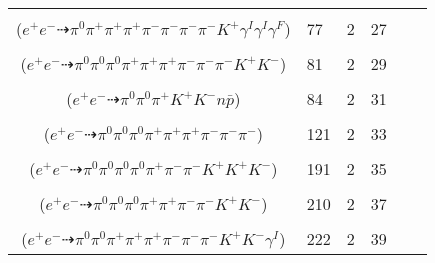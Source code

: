 \documentclass[landscape]{article}
\newcounter{rownumbers}
\newcommand\rn{\stepcounter{rownumbers}\arabic{rownumbers}}
\newcommand{\EOL}{\\} %
\newcommand{\topoTags}[1]{#1} %
\begin{document}
\begin{longtable}{clcccc}
\rn & \makecell[l]{ $ 
e^{+} e^{-} \rightarrow \pi^{0} \rho^{0} \pi^{+} \pi^{-} \pi^{-} \bar{K}^{0} K^{+} \gamma^{I} \gamma^{I} ,
\rho^{0} \rightarrow \pi^{+} \pi^{-} \gamma^{F} ,
\bar{K}^{0} \rightarrow K_{S}^{0} ,
K_{S}^{0} \rightarrow \pi^{+} \pi^{-} 
$ \\ ($
e^{+} e^{-} \dashrightarrow \pi^{0} \pi^{+} \pi^{+} \pi^{+} \pi^{-} \pi^{-} \pi^{-} \pi^{-} K^{+} \gamma^{I} \gamma^{I} \gamma^{F} 
$) } & \topoTags{77 & }2 & 27 \EOL

\rn & \makecell[l]{ $ 
e^{+} e^{-} \rightarrow \pi^{0} \pi^{+} \pi^{+} \pi^{-} \rho^{+} \rho^{-} K^{*} K^{-} ,
\rho^{+} \rightarrow \pi^{0} \pi^{+} ,
\rho^{-} \rightarrow \pi^{0} \pi^{-} ,
K^{*} \rightarrow \pi^{-} K^{+} 
$ \\ ($
e^{+} e^{-} \dashrightarrow \pi^{0} \pi^{0} \pi^{0} \pi^{+} \pi^{+} \pi^{+} \pi^{-} \pi^{-} \pi^{-} K^{+} K^{-} 
$) } & \topoTags{81 & }2 & 29 \EOL

\rn & \makecell[l]{ $ 
e^{+} e^{-} \rightarrow \pi^{0} \pi^{0} \pi^{+} K^{+} K^{-} n \bar{p} 
$ \\ ($
e^{+} e^{-} \dashrightarrow \pi^{0} \pi^{0} \pi^{+} K^{+} K^{-} n \bar{p} 
$) } & \topoTags{84 & }2 & 31 \EOL

\rn & \makecell[l]{ $ 
e^{+} e^{-} \rightarrow \pi^{0} \pi^{+} \pi^{+} \pi^{-} \rho^{-} \omega ,
\rho^{-} \rightarrow \pi^{0} \pi^{-} ,
\omega \rightarrow \pi^{0} \pi^{+} \pi^{-} 
$ \\ ($
e^{+} e^{-} \dashrightarrow \pi^{0} \pi^{0} \pi^{0} \pi^{+} \pi^{+} \pi^{+} \pi^{-} \pi^{-} \pi^{-} 
$) } & \topoTags{121 & }2 & 33 \EOL

\rn & \makecell[l]{ $ 
e^{+} e^{-} \rightarrow \pi^{0} \pi^{+} \pi^{-} \pi^{-} \bar{K}^{*} K^{+} K^{+} K^{-} ,
\bar{K}^{*} \rightarrow \pi^{0} \bar{K}^{0} ,
\bar{K}^{0} \rightarrow K_{S}^{0} ,
K_{S}^{0} \rightarrow \pi^{0} \pi^{0} 
$ \\ ($
e^{+} e^{-} \dashrightarrow \pi^{0} \pi^{0} \pi^{0} \pi^{0} \pi^{+} \pi^{-} \pi^{-} K^{+} K^{+} K^{-} 
$) } & \topoTags{191 & }2 & 35 \EOL

\rn & \makecell[l]{ $ 
e^{+} e^{-} \rightarrow \pi^{0} \pi^{+} \pi^{-} \rho^{+} \rho^{-} K^{+} K^{-} ,
\rho^{+} \rightarrow \pi^{0} \pi^{+} ,
\rho^{-} \rightarrow \pi^{0} \pi^{-} 
$ \\ ($
e^{+} e^{-} \dashrightarrow \pi^{0} \pi^{0} \pi^{0} \pi^{+} \pi^{+} \pi^{-} \pi^{-} K^{+} K^{-} 
$) } & \topoTags{210 & }2 & 37 \EOL

\rn & \makecell[l]{ $ 
e^{+} e^{-} \rightarrow \pi^{0} \rho^{0} \pi^{+} \pi^{+} \pi^{-} \rho^{-} K^{+} K^{-} \gamma^{I} ,
\rho^{0} \rightarrow \pi^{+} \pi^{-} ,
\rho^{-} \rightarrow \pi^{0} \pi^{-} 
$ \\ ($
e^{+} e^{-} \dashrightarrow \pi^{0} \pi^{0} \pi^{+} \pi^{+} \pi^{+} \pi^{-} \pi^{-} \pi^{-} K^{+} K^{-} \gamma^{I} 
$) } & \topoTags{222 & }2 & 39 \EOL


\end{longtable}
\end{document}
